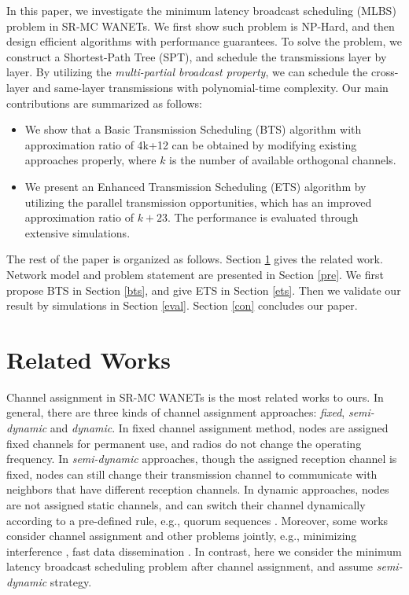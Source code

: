 \documentclass[10pt, conference]{IEEEtran}
\begin{document}
In this paper, we investigate the minimum latency broadcast
scheduling (MLBS) problem in SR-MC WANETs. We first show such
problem is NP-Hard, and then design efficient algorithms with
performance guarantees. To solve the problem, we construct a
Shortest-Path Tree (SPT), and schedule the transmissions layer
by layer. By utilizing the \emph{multi-partial broadcast
property}, we can schedule the cross-layer and same-layer
transmissions with polynomial-time complexity. Our main
contributions are summarized as follows:
\begin{itemize}
  \item We show that a Basic Transmission Scheduling (BTS) algorithm with approximation ratio of 4k+12 can be obtained by modifying existing approaches properly, where $k$ is the number of available orthogonal channels.
  \item We present an Enhanced Transmission Scheduling (ETS) algorithm by utilizing the parallel transmission opportunities, which has an improved approximation ratio of $k+23$. The performance is evaluated through extensive simulations.
\end{itemize}

The rest of the paper is organized as follows. Section \ref{rw}
gives the related work. Network model and problem statement are
presented in Section \ref{pre}. We first propose BTS in Section
\ref{bts}, and give ETS in Section \ref{ets}. Then we validate
our result by simulations in Section \ref{eval}. Section
\ref{con} concludes our paper.

\section{Related Works} \label{rw}
Channel assignment in SR-MC WANETs is the most related works to
ours. In general, there are three kinds of channel assignment
approaches: \emph{fixed}, \emph{semi-dynamic} and
\emph{dynamic}. In fixed channel assignment method, nodes are
assigned fixed channels for permanent use, and radios do not
change the operating frequency. In \emph{semi-dynamic}
approaches, though the assigned reception channel is fixed,
nodes can still change their transmission channel to
communicate with neighbors that have different reception
channels. In dynamic approaches, nodes are not assigned static
channels, and can switch their channel dynamically according to
a pre-defined rule, e.g., quorum sequences \cite{Quorum}.
Moreover, some works consider channel assignment and other
problems jointly, e.g., minimizing interference
\cite{component}, fast data dissemination \cite{TON09}. In
contrast, here we consider the minimum latency broadcast
scheduling problem after channel assignment, and assume
\emph{semi-dynamic} strategy.
\end{document}
